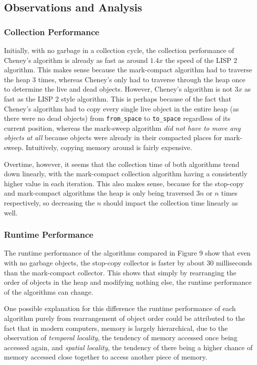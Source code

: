 \documentclass[index]{subfiles}
\begin{document}
\subsection{Observations and Analysis}

\subsubsection{Collection Performance}

Initially, with no garbage in a collection cycle, the collection performance of Cheney's algorithm is already as fast as around \(1.4x\) the speed of the LISP 2 algorithm. This makes sense because the mark-compact algorithm had to traverse the heap 3 times, whereas Cheney's only had to traverse through the heap once to determine the live and dead objects. However, Cheney's algorithm is not \(3x\) as fast as the LISP 2 style algorithm. This is perhaps because of the fact that Cheney's algorithm had to copy every single live object in the entire heap (as there were no dead objects) from \verb+from_space+ to \verb+to_space+ regardless of its current position, whereas the mark-sweep algorithm \textit{did not have to move any objects at all} because objects were already in their compacted places for mark-sweep. Intuitively, copying memory around is fairly expensive.

Overtime, however, it seems that the collection time of both algorithms trend down linearly, with the mark-compact collection algorithm having a consistently higher value in each iteration. This also makes sense, because for the stop-copy and mark-compact algorithms the heap is only being traversed \(3n\) or \(n\) times respectively, so decreasing the \(n\) should impact the collection time linearly as well.

\subsubsection{Runtime Performance}

The runtime performance of the algorithms compared in Figure 9 show that even with no garbage objects, the stop-copy collector is faster by about 30 milliseconds than the mark-compact collector. This shows that simply by rearranging the order of objects in the heap and modifying nothing else, the runtime performance of the algorithms can change.

One possible explanation for this difference the runtime performance of each algorithm purely from rearrangement of object order could be attributed to the fact that in modern computers, memory is largely hierarchical\cite{simondevCanJavaScriptGo2021}, due to the observation of \textit{temporal locality}, the tendency of memory accessed once being accessed again, and \textit{spatial locality}, the tendency of there being a higher chance of memory accessed close together to access another piece of memory\cite[18:21]{oracledevelopersCachingUnderstandMeasure2015}.
\end{document}
